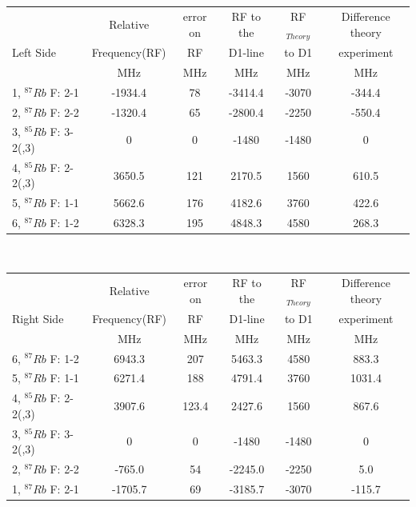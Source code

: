 


\begin{center}%
\begin{tabular}[H]{| l | c c c c c |} \hline
 & Relative & error on & RF to the & RF$_{Theory}$ & Difference theory \\
Left Side & Frequency\footnotemark[1] (RF) & RF & D1-line & to D1 & experiment\\ \cline{2-6}
 & MHz & MHz & MHz & MHz & MHz \\ \hline \hline
1, $^{87}Rb$ F: 2-1 & -1934.4 & 78 & -3414.4 & -3070 & -344.4  	\\
2, $^{87}Rb$ F: 2-2 & -1320.4 & 65 & -2800.4 & -2250 & -550.4  	\\
3, $^{85}Rb$ F: 3-2(,3) &        0    & 0 & -1480 & -1480 & 0 		 \\
4, $^{85}Rb$ F: 2-2(,3) & 3650.5 & 121 & 2170.5 & 1560 & 610.5  		\\
5, $^{87}Rb$ F: 1-1 & 5662.6  & 176 & 4182.6 & 3760 & 422.6 		\\
6, $^{87}Rb$ F: 1-2 & 6328.3  & 195 & 4848.3 & 4580 & 268.3  		\\ \hline
\end{tabular}\\ 
\end{center}



\begin{center}%
\begin{tabular}[H]{| l | c c c c c |} \hline
 & Relative & error on & RF to the & RF$_{Theory}$ & Difference theory \\
Right Side & Frequency\footnotemark[1] (RF) & RF & D1-line & to D1 & experiment\\ \cline{2-6}
 & MHz & MHz & MHz & MHz & MHz \\ \hline \hline
6, $^{87}Rb$ F: 1-2 & 6943.3 & 207 & 5463.3 & 4580 & 883.3 	\\
5, $^{87}Rb$ F: 1-1 & 6271.4 & 188 & 4791.4 & 3760 & 1031.4 	\\
4, $^{85}Rb$ F: 2-2(,3) & 3907.6 & 123.4 & 2427.6 & 1560 & 867.6 	\\
3, $^{85}Rb$ F: 3-2(,3) & 0 	  & 0 & -1480   & -1480 & 0  		\\
2, $^{87}Rb$ F: 2-2 & -765.0  & 54 & -2245.0& -2250 & 5.0  		\\
1, $^{87}Rb$ F: 2-1 & -1705.7& 69 & -3185.7& -3070 & -115.7 	\\ \hline
\end{tabular}
\end{center}

